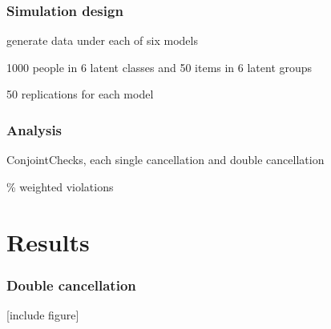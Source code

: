\documentclass[10pt,serif,professionalfont]{beamer}
\begin{document}

\begin{frame}
    \frametitle{Simulation design}

    generate data under each of six models
    
    1000 people in 6 latent classes and 50 items in 6 latent groups
    
    50 replications for each model

\end{frame}

\begin{frame}
    \frametitle{Analysis}

    ConjointChecks, each single cancellation and double cancellation
    
    \% weighted violations

\end{frame}


\section{Results}

\begin{frame}
    \frametitle{Double cancellation}

    [include figure]

\end{frame}
\end{document}
